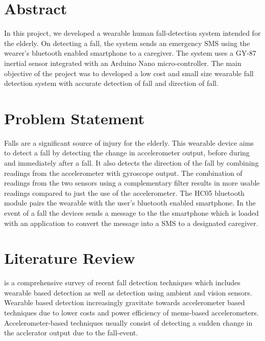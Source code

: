 \documentclass[11pt, a4paper]{article}
\begin{document}
\pagestyle{plain}
\def\title{Human Fall Detection}
\def\what{EE712 Embedded System Design}
\def\who{Simranjeet Singh (183076005) <183076005@iitb.ac.in> \\
Sonali Shukla (184070014) <184070014@iitb.ac.in> \\
Niraj N Sharma (184077001) <nirajns@iitb.ac.in> \\
Group 20}
\def\guide{Prof.~P.~C.~Pandey \& Prof.~D.~K.~Sharma}
\titlpage
\newpage

\section*{Abstract}
In this project, we developed a wearable human fall-detection system
intended for the elderly. On detecting a fall, the system sends an
emergency SMS using the wearer's bluetooth enabled smartphone to a
caregiver. The system uses a GY-87 inertial sensor integrated with an
Arduino Nano micro-controller. The main objective of the project was to developed a low cost and small size wearable fall detection system with accurate detection of fall and direction of fall.

\section{Problem Statement}
Falls are a significant source of injury for the elderly. This wearable
device aims to detect a fall by detecting the change in accelerometer
output, before during and immediately after a fall. It also detects the
direction of the fall by combining readings from the accelerometer with
gyroscope output. The combination of readings from the two sensors using a
complementary filter results in more usable readings compared to
just the use of the accelerometer. The HC05 bluetooth module pairs the
wearable with the user's bluetooth enabled smartphone. In the event of a
fall the devices sends a message to the the smartphone which is loaded
with an application to convert the message into a SMS to a designated
caregiver.

\section{Literature Review}
\cite{Mubashir2013} is a comprehensive survey of recent fall detection
techniques which includes wearable based detection as well as detection
using ambient and vision sensors. Wearable based detection increasingly
gravitate towards accelerometer based techniques due to lower costs and
power efficiency of mems-based accelerometers. Accelerometer-based techniques
usually consist of detecting a sudden change in the acclerator output due to
the fall-event.
\end{document}
